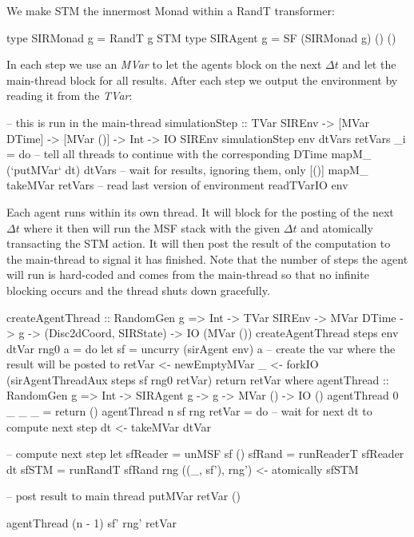 We make STM the innermost Monad within a RandT transformer:
\begin{HaskellCode}
type SIRMonad g   = RandT g STM
type SIRAgent g   = SF (SIRMonad g) () ()
\end{HaskellCode}

In each step we use an \textit{MVar} to let the agents block on the next $\Delta t$ and let the main-thread block for all results. After each step we output the environment by reading it from the \textit{TVar}:
\begin{HaskellCode}
-- this is run in the main-thread
simulationStep :: TVar SIREnv
               -> [MVar DTime]
               -> [MVar ()]
               -> Int
               -> IO SIREnv
simulationStep env dtVars retVars _i = do
  -- tell all threads to continue with the corresponding DTime
  mapM_ (`putMVar` dt) dtVars
  -- wait for results, ignoring them, only [()]
  mapM_ takeMVar retVars
  -- read last version of environment
  readTVarIO env
\end{HaskellCode}

Each agent runs within its own thread. It will block for the posting of the next $\Delta t$ where it then will run the MSF stack with the given $\Delta t$ and atomically transacting the STM action. It will then post the result of the computation to the main-thread to signal it has finished. Note that the number of steps the agent will run is hard-coded and comes from the main-thread so that no infinite blocking occurs and the thread shuts down gracefully.

\begin{HaskellCode}
createAgentThread :: RandomGen g 
                  => Int 
                  -> TVar SIREnv
                  -> MVar DTime
                  -> g
                  -> (Disc2dCoord, SIRState)
                  -> IO (MVar ())
createAgentThread steps env dtVar rng0 a = do
    let sf = uncurry (sirAgent env) a
    -- create the var where the result will be posted to
    retVar <- newEmptyMVar
    _ <- forkIO (sirAgentThreadAux steps sf rng0 retVar)
    return retVar
  where
    agentThread :: RandomGen g 
                => Int
                -> SIRAgent g
                -> g
                -> MVar ()
                -> IO ()
    agentThread 0 _ _ _ = return ()
    agentThread n sf rng retVar = do
      -- wait for next dt to compute next step
      dt <- takeMVar dtVar

      -- compute next step
      let sfReader = unMSF sf ()
          sfRand   = runReaderT sfReader dt
          sfSTM    = runRandT sfRand rng
      ((_, sf'), rng') <- atomically sfSTM 
      
      -- post result to main thread
      putMVar retVar ()
      
      agentThread (n - 1) sf' rng' retVar
\end{HaskellCode}

